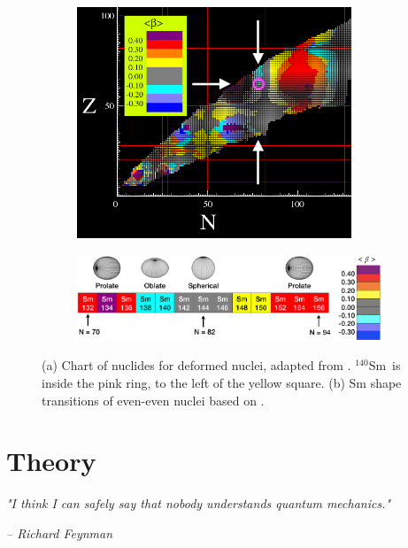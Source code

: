 \documentclass[twoside,english]{uiofysmaster/uiofysmaster}
\newcommand{\Sm}{$^{140}$Sm} %
\begin{document}
\begin{figure}[ht]
	\centering
	\begin{subfigure}{\textwidth}
		\centering
		\includegraphics[width=0.9\textwidth]{Images/cea-CoN-adjusted.png}
		\caption{}
		\label{fig:cea_CoN}
	\end{subfigure}
	\begin{subfigure}{\textwidth}
		\centering
		\includegraphics[width=\textwidth]{Images/Sm-shapes.png}
		\caption{}
		\label{fig:Sm-shapes}
	\end{subfigure}
	\caption{(a) Chart of nuclides for deformed nuclei, adapted from \cite{Hilaire2007, CEA}. \Sm\ is inside the pink ring, to the left of the yellow square.
	 (b) Sm shape transitions of even-even nuclei based on \cite{Hilaire2007, CEA}.
	 }
	\label{fig:deformation}
\end{figure}




\chapter{Theory}\label{ch:theory}
\epigraph{\textit{"I think I can safely say that nobody understands quantum mechanics."}}{\textit{– Richard Feynman}}
\end{document}
